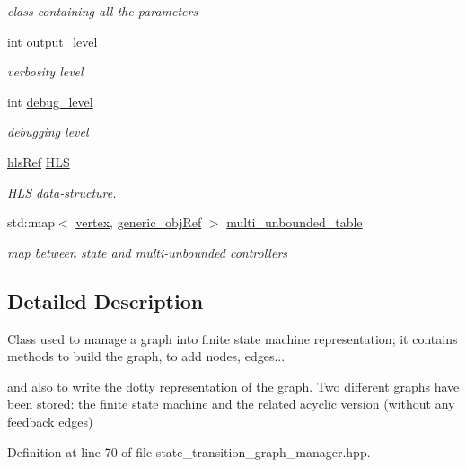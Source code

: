 \begin{DoxyCompactItemize}
\begin{DoxyCompactList}\small\item\em class containing all the parameters \end{DoxyCompactList}\item 
int \hyperlink{classStateTransitionGraphManager_a7549b027c2d5081cf5baa7dc53acdfb9}{output\+\_\+level}
\begin{DoxyCompactList}\small\item\em verbosity level \end{DoxyCompactList}\item 
int \hyperlink{classStateTransitionGraphManager_a6ccfa0fe45455f79f694c771213bd5a3}{debug\+\_\+level}
\begin{DoxyCompactList}\small\item\em debugging level \end{DoxyCompactList}\item 
\hyperlink{hls_8hpp_a75d0c73923d0ddfa28c4843a802c73a7}{hls\+Ref} \hyperlink{classStateTransitionGraphManager_a53c457064906c1b6c3c0a8e8a05664a6}{H\+LS}
\begin{DoxyCompactList}\small\item\em H\+LS data-\/structure. \end{DoxyCompactList}\item 
std\+::map$<$ \hyperlink{graph_8hpp_abefdcf0544e601805af44eca032cca14}{vertex}, \hyperlink{generic__obj_8hpp_acb533b2ef8e0fe72e09a04d20904ca81}{generic\+\_\+obj\+Ref} $>$ \hyperlink{classStateTransitionGraphManager_ade73b11f02d845f36315897297c0b0ac}{multi\+\_\+unbounded\+\_\+table}
\begin{DoxyCompactList}\small\item\em map between state and multi-\/unbounded controllers \end{DoxyCompactList}\end{DoxyCompactItemize}


\subsection{Detailed Description}
Class used to manage a graph into finite state machine representation; it contains methods to build the graph, to add nodes, edges... 

and also to write the dotty representation of the graph. Two different graphs have been stored\+: the finite state machine and the related acyclic version (without any feedback edges) 

Definition at line 70 of file state\+\_\+transition\+\_\+graph\+\_\+manager.\+hpp.



